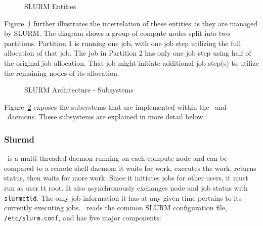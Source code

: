 \begin{figure}[tcb]
\centerline{}
\caption{SLURM Entities}
\label{entities}
\end{figure}

Figure~\ref{entities} further illustrates the interrelation of these
entities as they are managed by SLURM. The diagram shows a group of
compute nodes split into two partitions. Partition 1 is running one
job, with one job step utilizing the full allocation of that job.
The job in Partition 2 has only one job step using half of the original
job allocation.
That job might initiate additional job step(s) to utilize 
the remaining nodes of its allocation.

\begin{figure}[tb]
\centerline{}
\caption{SLURM Architecture - Subsystems}
\label{archdetail}
\end{figure}

Figure~\ref{archdetail} exposes the subsystems that are implemented
within the \slurmd\ and \slurmctld\ daemons.  These subsystems
are explained in more detail below.

\subsubsection{Slurmd}

\slurmd\ is a multi-threaded daemon running on each compute node and 
can be compared to a remote shell daemon:  
it waits for work, executes the work, returns status,
then waits for more work.  
Since it initiates jobs for other users, it must run as user {tt root}.
It also asynchronously exchanges node and job status with {\tt slurmctld}.  
The only job information it has at any given time pertains to its 
currently executing jobs.
\slurmd\ reads the common SLURM configuration file, {\tt /etc/slurm.conf},
and has five major components:

